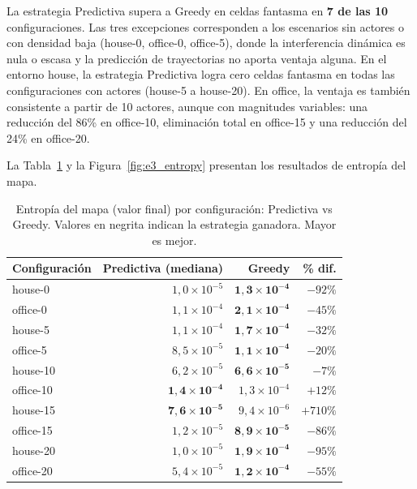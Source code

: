 La estrategia Predictiva supera a Greedy en celdas fantasma en \textbf{7 de las 10} configuraciones. Las tres excepciones corresponden a los escenarios sin actores o con densidad baja (house-0, office-0, office-5), donde la interferencia dinámica es nula o escasa y la predicción de trayectorias no aporta ventaja alguna. En el entorno house, la estrategia Predictiva logra cero celdas fantasma en todas las configuraciones con actores (house-5 a house-20). En office, la ventaja es también consistente a partir de 10 actores, aunque con magnitudes variables: una reducción del 86\% en office-10, eliminación total en office-15 y una reducción del 24\% en office-20.

La Tabla~\ref{tab:e3_entropy} y la Figura~\ref{fig:e3_entropy} presentan los resultados de entropía del mapa.

\begin{table}[htbp]
    \centering
    \caption{Entropía del mapa (valor final) por configuración: Predictiva vs Greedy. Valores en negrita indican la estrategia ganadora. Mayor es mejor.}%
    \label{tab:e3_entropy}
    \begin{tabular}{lrrr}
        \toprule
        \textbf{Configuración} & \textbf{Predictiva (mediana)} & \textbf{Greedy} & \textbf{\% dif.} \\
        \midrule
        house-0   & $1{,}0 \times 10^{-5}$  & $\mathbf{1{,}3 \times 10^{-4}}$ & $-92\%$ \\
        office-0  & $1{,}1 \times 10^{-4}$  & $\mathbf{2{,}1 \times 10^{-4}}$ & $-45\%$ \\
        house-5   & $1{,}1 \times 10^{-4}$  & $\mathbf{1{,}7 \times 10^{-4}}$ & $-32\%$ \\
        office-5  & $8{,}5 \times 10^{-5}$  & $\mathbf{1{,}1 \times 10^{-4}}$ & $-20\%$ \\
        house-10  & $6{,}2 \times 10^{-5}$  & $\mathbf{6{,}6 \times 10^{-5}}$ & $-7\%$  \\
        office-10 & $\mathbf{1{,}4 \times 10^{-4}}$ & $1{,}3 \times 10^{-4}$ & $+12\%$ \\
        house-15  & $\mathbf{7{,}6 \times 10^{-5}}$ & $9{,}4 \times 10^{-6}$  & $+710\%$ \\
        office-15 & $1{,}2 \times 10^{-5}$  & $\mathbf{8{,}9 \times 10^{-5}}$ & $-86\%$ \\
        house-20  & $1{,}0 \times 10^{-5}$  & $\mathbf{1{,}9 \times 10^{-4}}$ & $-95\%$ \\
        office-20 & $5{,}4 \times 10^{-5}$  & $\mathbf{1{,}2 \times 10^{-4}}$ & $-55\%$ \\
        \bottomrule
    \end{tabular}
\end{table}

